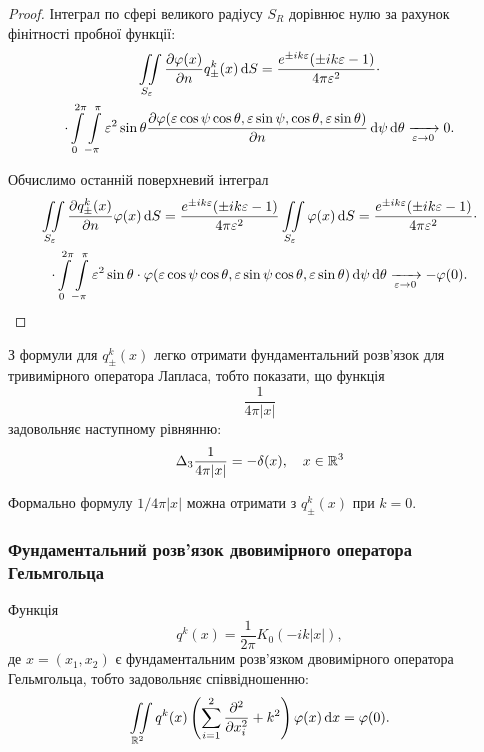 \begin{proof}
	Інтеграл по сфері великого радіусу $S_R$ дорівнює нулю за рахунок фінітності пробної функції:
	\begin{multline}
		\displaystyle\iint\limits_{S_\varepsilon}\frac{\partial\varphi(x)}{\partial n}q_\pm^k(x)\mathop{}\!\mathrm{d} S=\frac{e^{\pm ik\varepsilon}(\pm ik\varepsilon-1)}{4\pi\varepsilon^2}\cdot\\
		\cdot\displaystyle\int\limits_0^{2\pi}\displaystyle\int\limits_{-\pi}^\pi\varepsilon^2\sin\theta\frac{\partial\varphi(\varepsilon\cos\psi\cos\theta,\varepsilon\sin\psi,\cos\theta,\varepsilon\sin\theta)}{\partial n}\mathop{}\!\mathrm{d}\psi\mathop{}\!\mathrm{d}\theta\xrightarrow[\varepsilon\to0]{}0.
	\end{multline}

	Обчислимо останній поверхневий інтеграл
	\begin{multline}
		\displaystyle\iint\limits_{S_\varepsilon} \frac{\partial q_\pm^k(x)}{\partial n} \varphi(x)\mathop{}\!\mathrm{d} S = \frac{e^{\pm ik\varepsilon}(\pm ik\varepsilon-1)}{4\pi\varepsilon^2} \displaystyle\iint\limits_{S_\varepsilon}\varphi(x)\mathop{}\!\mathrm{d} S=\frac{e^{\pm ik\varepsilon}(\pm ik\varepsilon-1)}{4\pi\varepsilon^2} \cdot \\
		\cdot \displaystyle\int\limits_0^{2\pi}\displaystyle\int\limits_{-\pi}^\pi \varepsilon^2\sin\theta\cdot\varphi(\varepsilon\cos\psi\cos\theta,\varepsilon\sin\psi\cos\theta,\varepsilon\sin\theta)\mathop{}\!\mathrm{d}\psi\mathop{}\!\mathrm{d}\theta\xrightarrow[\varepsilon\to0]{}-\varphi(0).
	\end{multline}
\end{proof}

\begin{remark}
	З формули для $q_\pm^k(x)$ легко отримати фундаментальний розв'язок для тривимірного оператора Лапласа, тобто показати, що функція
	\begin{equation}
		\frac{1}{4 \pi |x|}
	\end{equation}
	задовольняє наступному рівнянню:
	\begin{equation}
		\Delta_3 \frac{1}{4 \pi |x|} = - \delta(x), \quad x \in \mathbb{R}^3
	\end{equation}
\end{remark}

\begin{remark}
	Формально формулу $1 / 4 \pi |x|$ можна отримати з $q_\pm^k(x)$ при $k = 0$.
\end{remark}

\subsubsection{Фундаментальний розв'язок двовимірного оператора Гельмгольца}

\begin{theorem}
	Функція
	\begin{equation}
		q^k(x) = \frac{1}{2\pi}K_0(-ik|x|),
	\end{equation}
	де $x = (x_1, x_2)$ є фундаментальним розв'язком двовимірного оператора Гельмгольца, тобто задовольняє співвідношенню:
	\begin{equation}
		\displaystyle\iint\limits_{\mathbb{R}^2}q^k(x)\left(\displaystyle\sum\limits_{i=1}^2\frac{\partial^2}{\partial x_i^2}+k^2\right) \varphi(x)\mathop{}\!\mathrm{d} x = \varphi(0).
	\end{equation}
\end{theorem}

